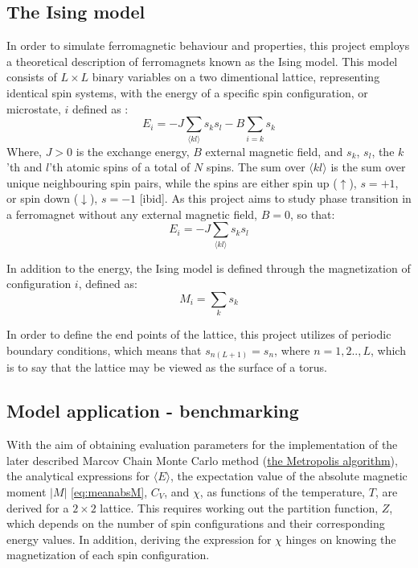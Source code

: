 \documentclass[%
oneside,                 %
final,                   %
10pt]{article}
\begin{document}
\subsection{The Ising model}   
\label{SS:Ising}	
In order to simulate ferromagnetic behaviour and properties, this project employs a theoretical description of ferromagnets known as the Ising model. This model consists of $L \times L$ binary variables on a two dimentional lattice, representing identical spin systems, with the energy of a specific spin configuration, or microstate, $i$ defined as \cite{Fitzpatrick}:
\begin{equation}
E_i=-J\sum_{\langle kl \rangle} s_k s_l -B \sum_{i=k} s_k
\end{equation} 
Where, $J>0$ is the exchange energy, $B$ external magnetic field, and $s_k$, $s_l$, the $k$'th and $l$'th atomic spins of a total of $N$ spins. The sum over ${\langle kl \rangle}$ is the sum over unique neighbouring spin pairs, while the spins are either spin up ($\uparrow $), $s=+1$, or spin down ($\downarrow $), $s=-1$ [ibid].  As this project aims to study phase transition in a ferromagnet without any external magnetic field, $B=0$, so that:
\begin{equation}
E_i=-J\sum_{\langle kl \rangle} s_k s_l 
\label{eq:IsingEnergy}
\end{equation} 

In addition to the energy, the Ising model is defined through the magnetization of configuration $i$, defined as:
\begin{equation}
M_i=\sum_{k} s_k  
\end{equation}

In order to define the end points of the lattice, this project utilizes of periodic boundary conditions, which means that $s_{n(L+1)}=s_{n}$, where $n=1,2..,L$, which is to say that the lattice may be viewed as the surface of a torus.  

\subsection{Model application - benchmarking}
\label{SS:M.Model_application}
With the aim of obtaining evaluation parameters for the implementation of the later described Marcov Chain Monte Carlo method (\hyperref[SS:MCMCmethod]{the Metropolis algorithm}), the analytical expressions for $\langle E \rangle$, the expectation value of the absolute magnetic moment $|M|$ \eqref{eq:meanabsM}, $C_V$, and $\chi$, as functions of the temperature, $T$, are derived for a $2 \times 2$ lattice. This requires working out the  partition function, $Z$, which depends on the number of spin configurations and their corresponding energy values. In addition, deriving the expression for $\chi$ hinges on knowing the magnetization of each spin configuration. \newline
\end{document}
